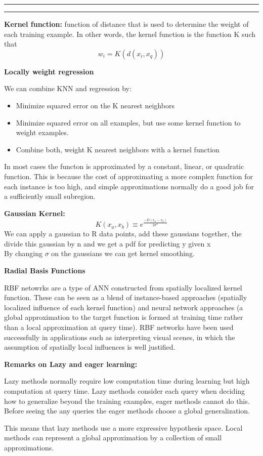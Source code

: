 \documentclass[11pt]{article}
\newcounter{questionCounter}
\newcounter{partCounter}[questionCounter]
\newenvironment{question}[2][\arabic{questionCounter}]{%
    \addtocounter{questionCounter}{1}%
    \setcounter{partCounter}{0}%
    \vspace{.25in} \hrule \vspace{0.5em}%
        \noindent{\bf #1: #2}%
    \vspace{0.8em} \hrule \vspace{.10in}%
}{}
\begin{document}
\begin{question}{Instance-Based Learning}
\textbf{Kernel function:} function of distance that is used to determine the weight of each training example.
In other words, the kernel function is the function K such that $$w_i = K(d(x_i, x_q))$$

\textbf{Locally weight regression}

We can combine KNN and regression by:

\begin{itemize}
    \item Minimize squared error on the K nearest neighbors \\
    \item Minimize squared error on all examples, but use some kernel function to weight examples. \\
    \item Combine both, weight K nearest neighbors with a kernel function \\
\end{itemize}

In most cases the functon is approximated by a constant, linear, or quadratic function.
This is because the cost of approximating a more complex function for each instance
is too high, and simple approximations normally do a good job for a sufficiently
small subregion.

\textbf{Gaussian Kernel:}
$$K(x_a, x_b) \equiv e^{\frac{-D(x_a - x_b)}{2\sigma^2}}$$
We can apply a gaussian to R data points, add these gaussians
together, the divide this gaussian by n and we get a pdf for
predicting y given x\\
By changing $\sigma$ on the gaussians we can get kernel smoothing.


\textbf{Radial Basis Functions}

RBF netowrks are a type of ANN constructed from spatially localized
kernel function. These can be seen as a blend of instance-based
approaches (spatially localized influence of each kernel function) and
neural network approaches (a global approximation to the
target function is formed at training time rather than a local
approximation
at query time). RBF networks have been used successfully in applications such as interpreting
visual scenes, in which the assumption of spatially
local influences is well justified.

\textbf{Remarks on Lazy and eager learning:}

Lazy methods normally require low computation time during learning
but high computation at query time.
Lazy methods consider each query when deciding how to generalize beyond the
training examples, eager methods cannot do this. Before seeing the any queries
the eager methods choose a global generalization.

This means that lazy methods use a more expressive hypothesis space. 
Local methods can represent a global approximation by a collection of 
small approximations. 

\end{question}
\end{document}
